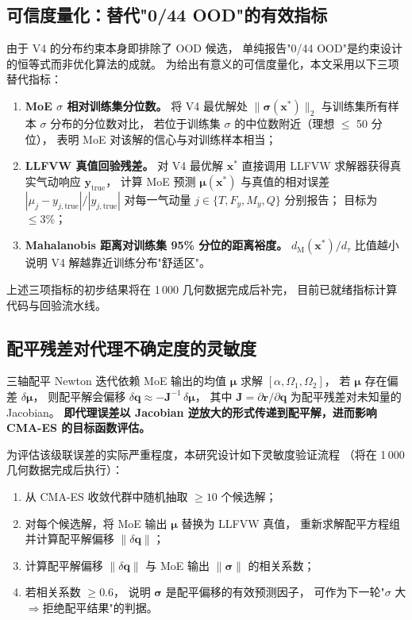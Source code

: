 \subsection{可信度量化：替代"0/44 OOD"的有效指标}
\label{sec:cred_metric}

由于 V4 的分布约束本身即排除了 OOD 候选，
单纯报告"0/44 OOD"是约束设计的恒等式而非优化算法的成就。
为给出有意义的可信度量化，本文采用以下三项替代指标：

\begin{enumerate}
  \item \textbf{MoE $\sigma$ 相对训练集分位数。}
        将 V4 最优解处 $\|\boldsymbol{\sigma}(\mathbf{x}^*)\|_2$
        与训练集所有样本 $\sigma$ 分布的分位数对比，
        若位于训练集 $\sigma$ 的中位数附近（理想 $\leq$ 50 分位），
        表明 MoE 对该解的信心与对训练样本相当；
  \item \textbf{LLFVW 真值回验残差。}
        对 V4 最优解 $\mathbf{x}^*$ 直接调用 LLFVW 求解器获得真实气动响应 $\mathbf{y}_{\text{true}}$，
        计算 MoE 预测 $\boldsymbol{\mu}(\mathbf{x}^*)$ 与真值的相对误差
        $|\mu_j - y_{j,\text{true}}|/|y_{j,\text{true}}|$
        对每一气动量 $j \in \{T, F_y, M_y, Q\}$ 分别报告；
        目标为 $\leq 3\%$；
  \item \textbf{Mahalanobis 距离对训练集 95\% 分位的距离裕度。}
        $d_{\text{M}}(\mathbf{x}^*) / d_\tau$ 比值越小说明 V4 解越靠近训练分布"舒适区"。
\end{enumerate}

上述三项指标的初步结果将在 1\,000 几何数据完成后补完，
目前已就绪指标计算代码与回验流水线。

\subsection{配平残差对代理不确定度的灵敏度}

三轴配平 Newton 迭代依赖 MoE 输出的均值 $\boldsymbol{\mu}$ 求解 $[\alpha, \Omega_1, \Omega_2]$，
若 $\boldsymbol{\mu}$ 存在偏差 $\delta\boldsymbol{\mu}$，
则配平解会偏移 $\delta\mathbf{q} \approx -\mathbf{J}^{-1}\,\delta\boldsymbol{\mu}$，
其中 $\mathbf{J} = \partial\mathbf{r}/\partial\mathbf{q}$ 为配平残差对未知量的 Jacobian。
\textbf{即代理误差以 Jacobian 逆放大的形式传递到配平解，进而影响 CMA-ES 的目标函数评估。}

为评估该级联误差的实际严重程度，本研究设计如下灵敏度验证流程
（将在 1\,000 几何数据完成后执行）：
\begin{enumerate}
  \item 从 CMA-ES 收敛代群中随机抽取 $\geq 10$ 个候选解；
  \item 对每个候选解，将 MoE 输出 $\boldsymbol{\mu}$ 替换为 LLFVW 真值，
        重新求解配平方程组并计算配平解偏移 $\|\delta\mathbf{q}\|$；
  \item 计算配平解偏移 $\|\delta\mathbf{q}\|$ 与 MoE 输出 $\|\boldsymbol{\sigma}\|$ 的相关系数；
  \item 若相关系数 $\geq 0.6$，
        说明 $\boldsymbol{\sigma}$ 是配平偏移的有效预测因子，
        可作为下一轮"$\sigma$ 大$\Rightarrow$拒绝配平结果"的判据。
\end{enumerate}

